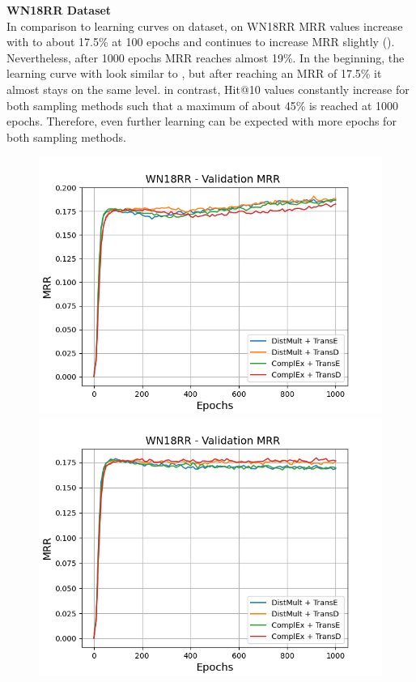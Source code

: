 \textbf{WN18RR Dataset}
\label{subsubsec:uncertainty_wn18rr} \\
%
In comparison to learning curves on \umls dataset, on \textsc{WN18RR} MRR values increase with \origsampling to about 17.5\% at 100 epochs and continues to increase MRR slightly ().
Nevertheless, after 1000 epochs MRR reaches almost 19\%.
In the beginning, the learning curve with \ussoftmax look similar to \origsampling, but after reaching an MRR of 17.5\% it almost stays on the same level.
in contrast, Hit@10 values constantly increase for both sampling methods such that a maximum of about 45\% is reached at 1000 epochs.
Therefore, even further learning can be expected with more epochs for both sampling methods.
\clearpage
\begin{figure}[H]
    \centering
    \begin{minipage}{.5\textwidth}
      \centering
      \includegraphics[width=0.9\linewidth]{figures/results/gan_train/not_pretrained/random/wn18rr/epochs1000/random_wn18rr_mrrs.png}
    \end{minipage}%
    \begin{minipage}{.5\textwidth}
      \centering
      \includegraphics[width=0.9\linewidth]{figures/results/gan_train/not_pretrained/uncertainty/max_distribution/entropy/wn18rr/1k_epochs/uncertainty_wn18rr_mrrs.png}

\end{minipage}
\end{figure}

